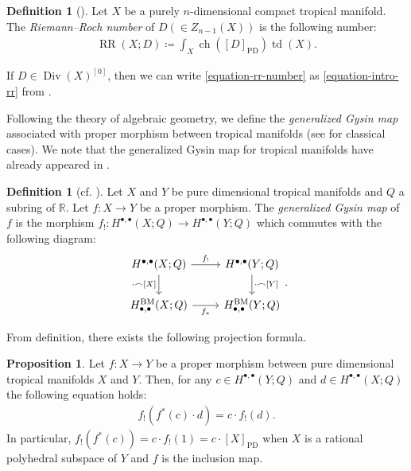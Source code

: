 \documentclass[a4paper,dvipdfmx,reqno,12pt]{amsart}
\theoremstyle{definition}
\newtheorem{definition}[theorem]{Definition}
\newtheorem{proposition}[theorem]{Proposition}
\newcommand{\deq}{\coloneqq}
\newcommand{\opn}[1]{\operatorname{#1}}
\newcommand{\PD}[1]{[#1]_{\mathrm{PD}}}
\numberwithin{equation}{section}
\begin{document}
\begin{definition}[{\cite[.(2)]{MR1335917}}]
\label{definition-rr-number}
Let $X$ be a purely $n$-dimensional
compact tropical manifold.
The \emph{Riemann--Roch number}
of $D(\in Z_{n-1}(X))$ is the following number:
\begin{align}
\label{equation-rr-number}
\opn{RR}(X;D)\deq \int_X \opn{ch}(\PD{D})\opn{td}(X).
\end{align}
\end{definition}
If $D\in \opn{Div}(X)^{[0]}$,
then we can write \cref{equation-rr-number}
as \cref{equation-intro-rr}
from \cite[Proposition 5.12]{MR4637248}.

Following the theory of algebraic geometry,
we define the \emph{generalized Gysin map}
associated with proper morphism between
tropical manifolds (see  
\cite[Chapter 13. Appendix]{MR2810322}
for classical cases).
We note that the generalized Gysin map
for tropical manifolds
have already appeared in \cite{amini2020hodge}.
\begin{definition}[{cf. \cite{amini2020hodge}}]
Let $X$ and $Y$ be pure dimensional tropical manifolds
and $Q$ a subring of $\mathbb{R}$.
Let $f\colon X\to Y$ be a proper morphism.
The \emph{generalized Gysin map} of $f$ is 
the morphism $f_!\colon H^{\bullet,\bullet}(X;Q)\to 
H^{\bullet,\bullet}(Y;Q)$
which commutes with the following diagram:
\begin{equation}
\begin{tikzcd}
	{H^{\bullet,\bullet}(X;Q)} & {H^{\bullet,\bullet}(Y;Q)} \\
	{H_{\bullet,\bullet}^{\mathrm{BM}}(X;Q)} & {H_{\bullet,\bullet}^{\mathrm{BM}}(Y;Q)}
	\arrow["{\cdot \frown [X]}"', from=1-1, to=2-1]
	\arrow["{\cdot\frown[Y]}", from=1-2, to=2-2]
	\arrow["{f_*}"', from=2-1, to=2-2]
	\arrow["{f_!}", from=1-1, to=1-2]
\end{tikzcd}.   
\end{equation}

\end{definition}
From definition, there exists the following projection formula.
\begin{proposition}
\label{equation-gysin-projection-formula}
Let $f\colon X\to Y$ be a proper morphism
between pure dimensional
tropical manifolds $X$ and $Y$.
Then, for any $c\in H^{\bullet,\bullet}(Y;Q) $ and
$d\in H^{\bullet,\bullet}(X;Q)$ the following equation holds:
\begin{align}
    f_!(f^{*}(c)\cdot d)=c\cdot f_!(d).
\end{align}
In particular, $f_!(f^{*}(c))=c\cdot f_!(1)=c\cdot \PD{X}$
when $X$ is a rational polyhedral subspace of $Y$ and 
$f$ is the inclusion map.
\end{proposition}
\end{document}
